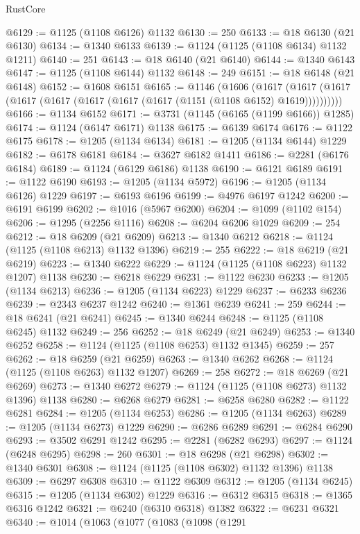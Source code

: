 \begin{lexlean}{RustCore}
\begin{coremodule}
@6129 := @1125 (@1108 @6126) @1132
@6130 := 250
@6133 := @18 @6130 (@21 @6130)
@6134 := @1340 @6133
@6139 := @1124 (@1125 (@1108 @6134) @1132 @1211)
@6140 := 251
@6143 := @18 @6140 (@21 @6140)
@6144 := @1340 @6143
@6147 := @1125 (@1108 @6144) @1132
@6148 := 249
@6151 := @18 @6148 (@21 @6148)
@6152 := @1608 @6151
@6165 := @1146
    (@1606
      (@1617 (@1617 (@1617 (@1617 (@1617 (@1617 (@1617 (@1617 (@1151 (@1108 @6152) @1619))))))))))
@6166 := @1134 @6152
@6171 := @3731 (@1145 (@6165 (@1199 @6166)) @1285)
@6174 := @1124 (@6147 @6171) @1138
@6175 := @6139 @6174
@6176 := @1122 @6175
@6178 := @1205 (@1134 @6134)
@6181 := @1205 (@1134 @6144) @1229
@6182 := @6178 @6181
@6184 := @3627 @6182 @1411
@6186 := @2281 (@6176 @6184)
@6189 := @1124 (@6129 @6186) @1138
@6190 := @6121 @6189
@6191 := @1122 @6190
@6193 := @1205 (@1134 @5972)
@6196 := @1205 (@1134 @6126) @1229
@6197 := @6193 @6196
@6199 := @4976 @6197 @1242
@6200 := @6191 @6199
@6202 := @1016 (@5967 @6200)
@6204 := @1099 (@1102 @154)
@6206 := @1295 (@2256 @1116)
@6208 := @6204 @6206 @1029
@6209 := 254
@6212 := @18 @6209 (@21 @6209)
@6213 := @1340 @6212
@6218 := @1124 (@1125 (@1108 @6213) @1132 @1396)
@6219 := 255
@6222 := @18 @6219 (@21 @6219)
@6223 := @1340 @6222
@6229 := @1124 (@1125 (@1108 @6223) @1132 @1207) @1138
@6230 := @6218 @6229
@6231 := @1122 @6230
@6233 := @1205 (@1134 @6213)
@6236 := @1205 (@1134 @6223) @1229
@6237 := @6233 @6236
@6239 := @2343 @6237 @1242
@6240 := @1361 @6239
@6241 := 259
@6244 := @18 @6241 (@21 @6241)
@6245 := @1340 @6244
@6248 := @1125 (@1108 @6245) @1132
@6249 := 256
@6252 := @18 @6249 (@21 @6249)
@6253 := @1340 @6252
@6258 := @1124 (@1125 (@1108 @6253) @1132 @1345)
@6259 := 257
@6262 := @18 @6259 (@21 @6259)
@6263 := @1340 @6262
@6268 := @1124 (@1125 (@1108 @6263) @1132 @1207)
@6269 := 258
@6272 := @18 @6269 (@21 @6269)
@6273 := @1340 @6272
@6279 := @1124 (@1125 (@1108 @6273) @1132 @1396) @1138
@6280 := @6268 @6279
@6281 := @6258 @6280
@6282 := @1122 @6281
@6284 := @1205 (@1134 @6253)
@6286 := @1205 (@1134 @6263)
@6289 := @1205 (@1134 @6273) @1229
@6290 := @6286 @6289
@6291 := @6284 @6290
@6293 := @3502 @6291 @1242
@6295 := @2281 (@6282 @6293)
@6297 := @1124 (@6248 @6295)
@6298 := 260
@6301 := @18 @6298 (@21 @6298)
@6302 := @1340 @6301
@6308 := @1124 (@1125 (@1108 @6302) @1132 @1396) @1138
@6309 := @6297 @6308
@6310 := @1122 @6309
@6312 := @1205 (@1134 @6245)
@6315 := @1205 (@1134 @6302) @1229
@6316 := @6312 @6315
@6318 := @1365 @6316 @1242
@6321 := @6240 (@6310 @6318) @1382
@6322 := @6231 @6321
@6340 := @1014
    (@1063
      (@1077
        (@1083
          (@1098
            (@1291

\end{coremodule}
\end{lexlean}
